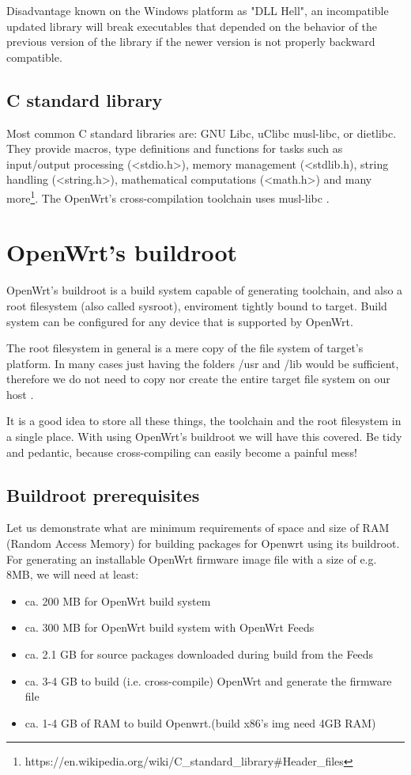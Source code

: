 Disadvantage known on the Windows platform as "DLL Hell", an incompatible updated library will break executables that depended on the behavior of the previous version of the library if the newer version is not properly backward compatible\cite{compiler}.
\subsection{C standard library}

Most common C standard libraries are: GNU Libc, uClibc musl-libc, or dietlibc.
They provide macros, type definitions and functions for tasks such as input/output processing (<stdio.h>), memory management (<stdlib.h), string handling (<string.h>), mathematical computations (<math.h>) and many more\footnote{https://en.wikipedia.org/wiki/C\_standard\_library\#Header\_files}.
The OpenWrt's cross-compilation toolchain uses musl-libc \cite{c_library}.

\section{OpenWrt's buildroot}

OpenWrt's buildroot is a build system capable of generating toolchain, and also a root filesystem (also called sysroot), enviroment tightly bound to target.
Build system can be configured for any device that is supported by OpenWrt.

The root filesystem in general is a mere copy of the file system of target's platform.
In many cases just having the folders /usr and /lib would be sufficient, therefore we do not need to copy nor create the entire target file system on our host .

It is a good idea to store all these things, the toolchain and the root filesystem in a single place.
With using OpenWrt's buildroot we will have this covered.
Be tidy and pedantic, because cross-compiling can easily become a painful mess!\cite{fabrizio}

\subsection{Buildroot prerequisites}

Let us demonstrate what are minimum requirements of space and size of RAM (Random Access Memory) for building packages for Openwrt using its buildroot.
For generating an installable OpenWrt firmware image file with a size of e.g. 8MB, we will need at least:
\begin{itemize}
\item ca. 200 MB for OpenWrt build system
\item ca. 300 MB for OpenWrt build system with OpenWrt Feeds
\item ca. 2.1 GB for source packages downloaded during build from the Feeds
\item ca. 3-4 GB to build (i.e. cross-compile) OpenWrt and generate the firmware file
\item ca. 1-4 GB of RAM to build Openwrt.(build x86's img need 4GB RAM)
\end{itemize}

